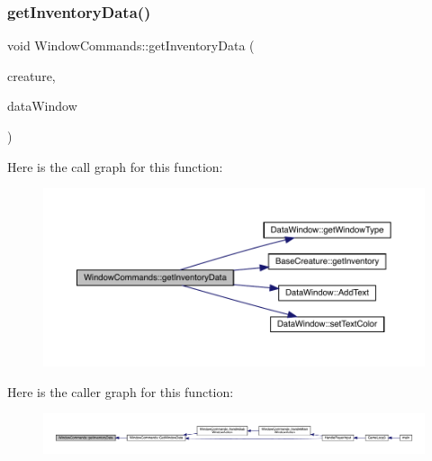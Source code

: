 \mbox{\label{class_window_commands_a1d8aea294ed36e2fc3fe061811b8513a}} 
\subsubsection{\texorpdfstring{get\+Inventory\+Data()}{getInventoryData()}}
{\footnotesize\ttfamily void Window\+Commands\+::get\+Inventory\+Data (\begin{DoxyParamCaption}\item[{\mbox{\hyperlink{class_base_creature}{Base\+Creature}} \&}]{creature,  }\item[{\mbox{\hyperlink{class_data_window}{Data\+Window}} \&}]{data\+Window }\end{DoxyParamCaption})}

Here is the call graph for this function\+:
\nopagebreak
\begin{figure}[H]
\begin{center}
\leavevmode
\includegraphics[width=350pt]{da/d07/class_window_commands_a1d8aea294ed36e2fc3fe061811b8513a_cgraph}
\end{center}
\end{figure}
Here is the caller graph for this function\+:
\nopagebreak
\begin{figure}[H]
\begin{center}
\leavevmode
\includegraphics[width=350pt]{da/d07/class_window_commands_a1d8aea294ed36e2fc3fe061811b8513a_icgraph}
\end{center}
\end{figure}
\mbox{\label{class_window_commands_ab301c0f80a6c632ce5a858e6307feebd}} 
